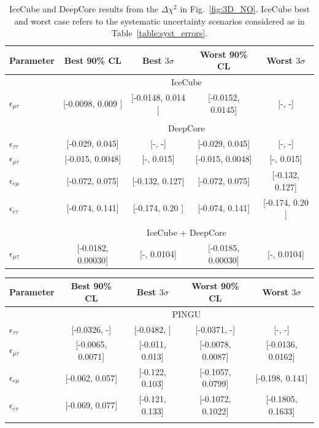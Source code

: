 \documentclass[draft=True]{revtex4-2}
\newcommand{\emt}{\ensuremath{\epsilon_{\mu\tau}}}
\newcommand{\eet}{\epsilon_{e\tau}}
\newcommand{\eem}{\epsilon_{e\mu}}
\newcommand{\ett}{\ensuremath{\epsilon_{\tau\tau}}}
\begin{document}
{{\renewcommand{\arraystretch}{1.3}
 \begin{table}
   \begin{center}
   \begin{tabular}{lcccc}
      \hline \hline
      Parameter & Best 90\% CL & Best $3\sigma$ & Worst 90\% CL & Worst $3\sigma$\\
      \hline & \multicolumn{4}{c}{IceCube}  \\
      $\emt$ & [-0.0098, 0.009 ] & [-0.0148, 0.014 ] & [-0.0152, 0.0145] & [-, -] \\\\
      & \multicolumn{4}{c}{DeepCore}\\ [0.3em]
      $\ett$ & [-0.029, 0.045] & [-, -]& [-0.029, 0.045] & [-, -] \\
      $\emt$ & [-0.015, 0.0048] & [-, 0.015]& [-0.015, 0.0048] & [-, 0.015] \\
      $\eem$ & [-0.072, 0.075] & [-0.132, 0.127]& [-0.072, 0.075] & [-0.132, 0.127]\\
      $\eet$ & [-0.074, 0.141] & [-0.174, 0.20  ]& [-0.074, 0.141] & [-0.174, 0.20  ]\\\\
      &\multicolumn{4}{c}{IceCube + DeepCore}\\
      $\emt$ & [-0.0182,  0.00030] & [-, 0.0104] & [-0.0185, 0.00030] & [-, 0.0104] \\
      \hline
      \hline
   \end{tabular}
   \end{center}
   \caption{IceCube and DeepCore results from the $\Delta \chi^2$ in Fig.~\ref{fig:3D_NO}. IceCube best and worst case refers to 
   the systematic uncertainty scenarios considered as in Table~\ref{table:syst_errors}.}\label{table:IC_DC_results}
\end{table}
\begin{table}
   \begin{tabular}{lcccc}
      \hline \hline
      Parameter & Best 90\% CL & Best $3\sigma$ & Worst 90\% CL & Worst $3\sigma$\\
      \hline & \multicolumn{4}{c}{PINGU} \\
      $\ett$ & [-0.0326, -] & [-0.0482, ] & [-0.0371, -] & [-, -] \\
      $\emt$ & [-0.0065, 0.0071] & [-0.011, 0.013] & [-0.0078, 0.0087] & [-0.0136, 0.0162] \\
      $\eem$ & [-0.062, 0.057] & [-0.122, 0.103] & [-0.1057, 0.0799] & [-0.198, 0.141]\\
      $\eet$ & [-0.069, 0.077] & [-0.121, 0.133] & [-0.1072, 0.1022] & [-0.1805, 0.1633]\\\\

\end{tabular}
\end{table}}}
\end{document}
